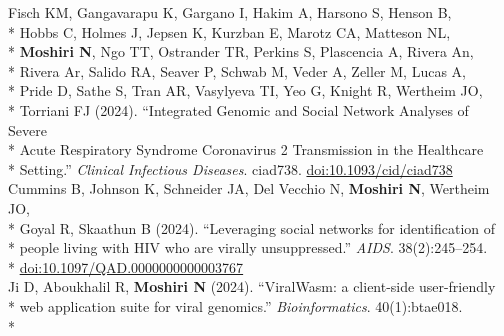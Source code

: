 \documentclass[margin,line]{res}
\begin{document}
\begin{resume}
\hspace*{9mm} Fisch KM, Gangavarapu K, Gargano I, Hakim A, Harsono S, Henson B,\\*
\hspace*{9mm} Hobbs C, Holmes J, Jepsen K, Kurzban E, Marotz CA, Matteson NL,\\*
\hspace*{9mm} \textbf{Moshiri N}, Ngo TT, Ostrander TR, Perkins S, Plascencia A, Rivera An,\\*
\hspace*{9mm} Rivera Ar, Salido RA, Seaver P, Schwab M, Veder A, Zeller M, Lucas A,\\*
\hspace*{9mm} Pride D, Sathe S, Tran AR, Vasylyeva TI, Yeo G, Knight R, Wertheim JO,\\*
\hspace*{9mm} Torriani FJ (2024). ``Integrated Genomic and Social Network Analyses of Severe\\*
\hspace*{9mm} Acute Respiratory Syndrome Coronavirus 2 Transmission in the Healthcare\\*\vspace{2mm}
\hspace*{8mm} Setting.'' \textit{Clinical Infectious Diseases}. ciad738. \href{https://doi.org/10.1093/cid/ciad738}{doi:10.1093/cid/ciad738}\\
\hspace*{4mm} Cummins B, Johnson K, Schneider JA, Del Vecchio N, \textbf{Moshiri N}, Wertheim JO,\\*
\hspace*{9mm} Goyal R, Skaathun B (2024). ``Leveraging social networks for identification of\\*
\hspace*{9mm} people living with HIV who are virally unsuppressed.'' \textit{AIDS}. 38(2):245--254.\\*\vspace{2mm}
\hspace*{8mm} \href{https://doi.org/10.1097/QAD.0000000000003767}{doi:10.1097/QAD.0000000000003767}\\
\hspace*{4mm} Ji D, Aboukhalil R, \textbf{Moshiri N} (2024). ``ViralWasm: a client-side user-friendly\\*
\hspace*{9mm} web application suite for viral genomics.'' \textit{Bioinformatics}. 40(1):btae018.\\*\vspace{2mm}

\end{resume}
\end{document}

